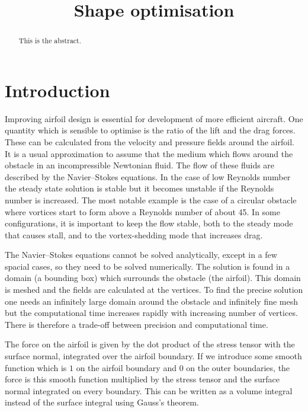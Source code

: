 \documentclass[12pt, a4paper]{article}
\begin{document}
\captionsetup{justification=centering}
\title{Shape optimisation}
\maketitle
\begin{abstract}
    This is the abstract.
\end{abstract}
\section{Introduction}
        Improving airfoil design is essential for development of more efficient aircraft. One quantity which is sensible to optimise is the ratio of the lift and the drag forces. These can be calculated from the velocity and pressure fields around the airfoil. It is a usual approximation to assume that the medium which flows around the obstacle in an incompressible Newtonian fluid. The flow of these fluids are described by the Navier--Stokes equations. In the case of low Reynolds number the steady state solution is stable but it becomes unstable if the Reynolds number is increased. The most notable example is the case of a circular obstacle where vortices start to form above a Reynolds number of about 45. In some configurations, it is important to keep the flow stable, both to the steady mode that causes stall, and to the vortex-shedding mode that increases drag.  
        
         The Navier--Stokes equations cannot be solved analytically, except in a few spacial cases, so they need to be solved numerically. The solution is found in a domain (a bounding box) which surrounds the obstacle (the airfoil). This domain is meshed and the fields are calculated at the vertices. To find the precise solution one needs an infinitely large domain around the obstacle and infinitely fine mesh but the computational time increases rapidly with increasing number of vertices. There is therefore a trade-off between precision and computational time.
        
        The force on the airfoil is given by the dot product of the stress tensor with the surface normal, integrated over the airfoil boundary. If we introduce some smooth function which is $1$ on the airfoil boundary and $0$ on the outer boundaries, the force is this smooth function multiplied by the stress tensor and the surface normal integrated on every boundary. This can be written as a volume integral instead of the surface integral using Gauss's theorem. %
        
\end{document}
